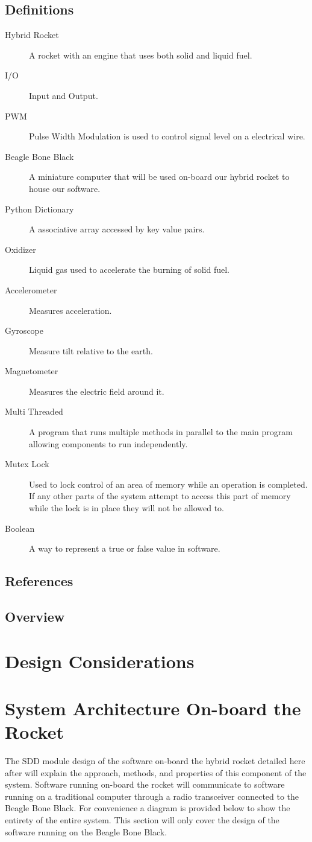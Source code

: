 \documentclass[10pt,draftclsnofoot,onecolumn,compsoc]{IEEEtran}
\begin{document}
\subsection{Definitions}
\begin{description}
	\item[Hybrid Rocket] A rocket with an engine that uses both solid and liquid fuel.
	\item[I/O] Input and Output.
	\item[PWM] Pulse Width Modulation is used to control signal level on a electrical wire.
	\item[Beagle Bone Black] A miniature computer that will be used on-board our hybrid rocket to house our software.
	\item[Python Dictionary] A associative array accessed by key value pairs.
	\item[Oxidizer] Liquid gas used to accelerate the burning of solid fuel.
	\item[Accelerometer] Measures acceleration.
	\item[Gyroscope] Measure tilt relative to the earth.
	\item[Magnetometer] Measures the electric field around it.
	\item[Multi Threaded] A program that runs multiple methods in parallel to the main program allowing components to run independently.
	\item[Mutex Lock] Used to lock control of an area of memory while an operation is completed. If any other parts of the system attempt to access this part of memory while the lock is in place they will not be allowed to.
	\item[Boolean] A way to represent a true or false value in software.
\end{description}
\subsection{References}
\subsection{Overview}
\section{Design Considerations}
\section{System Architecture On-board the Rocket }	
The SDD module design of the software on-board the hybrid rocket detailed here after will explain the approach, methods, and properties of this component of the system. Software running on-board the rocket will communicate to software running on a traditional computer through a radio transceiver connected to the Beagle Bone Black. For convenience a diagram is provided below to show the entirety of the entire system. This section will  only cover the design of the software running on the Beagle Bone Black.
\end{document}
